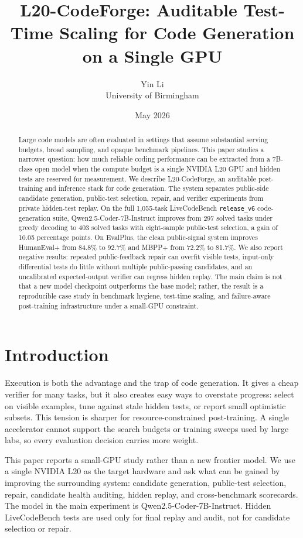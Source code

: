 \documentclass[11pt]{article}
\title{L20-CodeForge: Auditable Test-Time Scaling for Code Generation on a Single GPU}
\author{Yin Li\\University of Birmingham}
\date{May 2026}
\begin{document}
\maketitle

\begin{abstract}
Large code models are often evaluated in settings that assume substantial
serving budgets, broad sampling, and opaque benchmark pipelines. This paper
studies a narrower question: how much reliable coding performance can be
extracted from a 7B-class open model when the compute budget is a single NVIDIA
L20 GPU and hidden tests are reserved for measurement. We describe
L20-CodeForge, an auditable post-training and inference stack for code
generation. The system separates public-side candidate generation, public-test
selection, repair, and verifier experiments from private hidden-test replay. On
the full 1,055-task LiveCodeBench \texttt{release\_v6} code-generation suite,
Qwen2.5-Coder-7B-Instruct improves from 297 solved tasks under greedy decoding
to 403 solved tasks with eight-sample public-test selection, a gain of 10.05
percentage points. On EvalPlus, the clean public-signal system improves
HumanEval+ from 84.8\% to 92.7\% and MBPP+ from 72.2\% to 81.7\%. We also
report negative results: repeated public-feedback repair can overfit visible
tests, input-only differential tests do little without multiple
public-passing candidates, and an uncalibrated expected-output verifier can
regress hidden replay. The main claim is not that a new model checkpoint
outperforms the base model; rather, the result is a reproducible case study in
benchmark hygiene, test-time scaling, and failure-aware post-training
infrastructure under a small-GPU constraint.
\end{abstract}

\section{Introduction}

Execution is both the advantage and the trap of code generation. It gives a
cheap verifier for many tasks, but it also creates easy ways to overstate
progress: select on visible examples, tune against stale hidden tests, or report
small optimistic subsets. This tension is sharper for resource-constrained
post-training. A single accelerator cannot support the search budgets or
training sweeps used by large labs, so every evaluation decision carries more
weight.

This paper reports a small-GPU study rather than a new frontier model. We use a
single NVIDIA L20 as the target hardware and ask what can be gained by improving
the surrounding system: candidate generation, public-test selection, repair,
candidate health auditing, hidden replay, and cross-benchmark scorecards. The
model in the main experiment is Qwen2.5-Coder-7B-Instruct. Hidden LiveCodeBench
tests are used only for final replay and audit, not for candidate selection or
repair.
\end{document}
